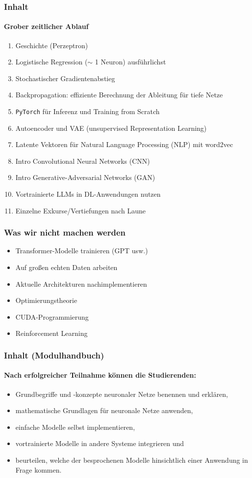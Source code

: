 \begin{frame}
  \frametitle{Inhalt}
  \framesubtitle{Grober zeitlicher Ablauf}

  \begin{enumerate}
  \item Geschichte (Perzeptron)
    \item Logistische Regression ($\sim$ 1 Neuron) ausführlichst
    \item Stochastischer Gradientenabstieg
    \item Backpropagation: effiziente Berechnung der Ableitung für tiefe Netze
    \item \texttt{PyTorch} für Inferenz und Training from Scratch
    \item Autoencoder und VAE (unsupervised Representation Learning)
    \item Latente Vektoren für Natural Language Processing (NLP) mit word2vec
    \item Intro Convolutional Neural Networks (CNN)
    \item Intro Generative-Adversarial Networks (GAN)
    \item Vortrainierte LLMs in DL-Anwendungen nutzen
    \item Einzelne Exkurse/Vertiefungen nach Laune
  \end{enumerate}
  
\end{frame}


\begin{frame}
  \frametitle{Was wir nicht machen werden}

  \begin{itemize}
  \item Transformer-Modelle trainieren (GPT usw.)
  \item Auf großen echten Daten arbeiten
  \item Aktuelle Architekturen nachimplementieren
  \item Optimierungstheorie
  \item CUDA-Programmierung
  \item Reinforcement Learning
  \end{itemize}
\end{frame}


\begin{frame}
  \frametitle{Inhalt (Modulhandbuch)}
  \framesubtitle{Nach erfolgreicher Teilnahme können die Studierenden:}

\begin{itemize}
\item Grundbegriffe und -konzepte neuronaler Netze benennen und erklären,
\item  mathematische Grundlagen für neuronale Netze anwenden,
\item  einfache Modelle selbst implementieren,
\item  vortrainierte Modelle in andere Systeme integrieren und
\item  beurteilen, welche der besprochenen Modelle hinsichtlich einer Anwendung in Frage kommen.
\end{itemize}

\end{frame}

